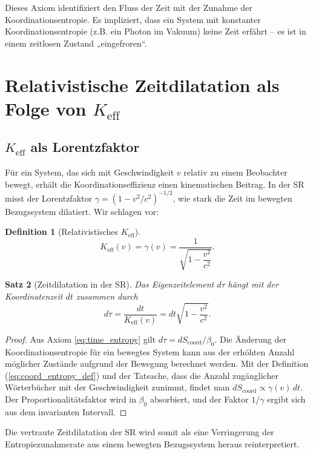 \documentclass[12pt,a4paper]{article}
\newtheorem{theorem}{Satz}[section]
\newtheorem{definition}[theorem]{Definition}
\newcommand{\Keff}{K_{\mathrm{eff}}}
\newcommand{\Scoord}{S_{\mathrm{coord}}}
\begin{document}
	Dieses Axiom identifiziert den Fluss der Zeit mit der Zunahme der Koordinationsentropie. Es impliziert, dass ein System mit konstanter Koordinationsentropie (z.B. ein Photon im Vakuum) keine Zeit erfährt – es ist in einem zeitlosen Zustand „eingefroren“.
	
	\section{Relativistische Zeitdilatation als Folge von \texorpdfstring{\(\Keff\)}{Keff}}
	\label{sec:sr}
	
	\subsection{\(\Keff\) als Lorentzfaktor}
	
	Für ein System, das sich mit Geschwindigkeit \(v\) relativ zu einem Beobachter bewegt, erhält die Koordinationseffizienz einen kinematischen Beitrag. In der SR misst der Lorentzfaktor \(\gamma = (1-v^2/c^2)^{-1/2}\), wie stark die Zeit im bewegten Bezugssystem dilatiert. Wir schlagen vor:
	\begin{definition}[Relativistisches \(\Keff\)]
		\[
		\Keff(v) = \gamma(v) = \frac{1}{\sqrt{1-\dfrac{v^2}{c^2}}}.
		\]
	\end{definition}
	
	\begin{theorem}[Zeitdilatation in der SR]
		Das Eigenzeitelement \(d\tau\) hängt mit der Koordinatenzeit \(dt\) zusammen durch
		\begin{equation}
			d\tau = \frac{dt}{\Keff(v)} = dt\sqrt{1-\frac{v^2}{c^2}}.
		\end{equation}
	\end{theorem}
	
	\begin{proof}
		Aus Axiom \ref{eq:time_entropy} gilt \(d\tau = d\Scoord/\beta_0\). Die Änderung der Koordinationsentropie für ein bewegtes System kann aus der erhöhten Anzahl möglicher Zustände aufgrund der Bewegung berechnet werden. Mit der Definition (\ref{eq:coord_entropy_def}) und der Tatsache, dass die Anzahl zugänglicher Wörterbücher mit der Geschwindigkeit zunimmt, findet man \(d\Scoord \propto \gamma(v)\, dt\). Der Proportionalitätsfaktor wird in \(\beta_0\) absorbiert, und der Faktor \(1/\gamma\) ergibt sich aus dem invarianten Intervall.
	\end{proof}
	
	Die vertraute Zeitdilatation der SR wird somit als eine Verringerung der Entropiezunahmerate aus einem bewegten Bezugssystem heraus reinterpretiert.
	
\end{document}
